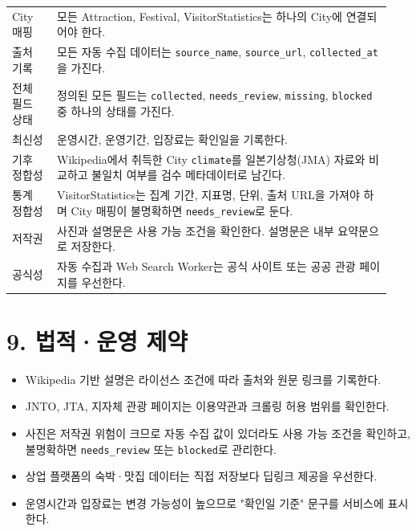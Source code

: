 \documentclass[12pt,a4paper]{article}
\newcommand{\DocNeedspace}[1]{\par\ifdim\dimexpr\pagegoal-\pagetotal\relax<#1\newpage\fi}
\newcommand{\TocNoChildTight}{\vspace{-0.28em}}
\begin{document}
\DocNeedspace{22\baselineskip}
\begin{small}
\begin{longtable}{@{}>{\RaggedRight\arraybackslash}m{0.117\linewidth}>{\RaggedRight\arraybackslash}m{0.823\linewidth}@{}}
\toprule
\multicolumn{1}{>{\centering\arraybackslash}m{0.117\linewidth}}{\textbf{검증 항목}} & \multicolumn{1}{>{\centering\arraybackslash}m{0.823\linewidth}}{\textbf{기준}} \\
\midrule
\endhead
City 매핑 & 모든 Attraction, Festival, VisitorStatistics는 하나의 City에 연결되어야 한다. \\
출처 기록 & 모든 자동 수집 데이터는 \texttt{source\_\allowbreak{}name}, \texttt{source\_\allowbreak{}url}, \texttt{collected\_\allowbreak{}at}을 가진다. \\
전체 필드 상태 & 정의된 모든 필드는 \texttt{collected}, \texttt{needs\_\allowbreak{}review}, \texttt{missing}, \texttt{blocked} 중 하나의 상태를 가진다. \\
최신성 & 운영시간, 운영기간, 입장료는 확인일을 기록한다. \\
기후 정합성 & Wikipedia에서 취득한 City \texttt{climate}를 일본기상청(JMA) 자료와 비교하고 불일치 여부를 검수 메타데이터로 남긴다. \\
통계 정합성 & VisitorStatistics는 집계 기간, 지표명, 단위, 출처 URL을 가져야 하며 City 매핑이 불명확하면 \texttt{needs\_\allowbreak{}review}로 둔다. \\
저작권 & 사진과 설명문은 사용 가능 조건을 확인한다. 설명문은 내부 요약문으로 저장한다. \\
공식성 & 자동 수집과 Web Search Worker는 공식 사이트 또는 공공 관광 페이지를 우선한다. \\
\bottomrule
\end{longtable}
\end{small}


\newpage

\DocNeedspace{10\baselineskip}
\section*{9. 법적·운영 제약}
\addtocontents{toc}{\protect\TocNoChildTight}


\begin{itemize}
\item Wikipedia 기반 설명은 라이선스 조건에 따라 출처와 원문 링크를 기록한다.
\item JNTO, JTA, 지자체 관광 페이지는 이용약관과 크롤링 허용 범위를 확인한다.
\item 사진은 저작권 위험이 크므로 자동 수집 값이 있더라도 사용 가능 조건을 확인하고, 불명확하면 \texttt{needs\_\allowbreak{}review} 또는 \texttt{blocked}로 관리한다.
\item 상업 플랫폼의 숙박·맛집 데이터는 직접 저장보다 딥링크 제공을 우선한다.
\item 운영시간과 입장료는 변경 가능성이 높으므로 "확인일 기준" 문구를 서비스에 표시한다.
\end{itemize}
\end{document}
